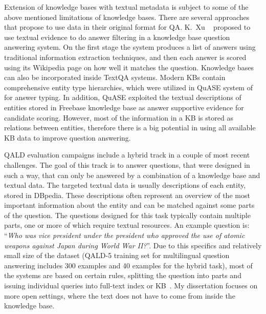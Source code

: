 Extension of knowledge bases with textual metadata is subject to some of the above mentioned limitations of knowledge bases.
There are several approaches that propose to use data in their original format for QA.
K.~Xu \etal~\cite{xu2016enhancing} proposed to use textual evidence to do answer filtering in a knowledge base question answering system.
On the first stage the system produces a list of answers using traditional information extraction techniques, and then each answer is scored using its Wikipedia page on how well it matches the question. 
Knowledge bases can also be incorporated inside TextQA systems.
Modern KBs contain comprehensive entity type hierarchies, which were utilized in QuASE system of~\cite{Sun:2015:ODQ:2736277.2741651} for answer typing.
In addition, QuASE exploited the textual descriptions of entities stored in Freebase knowledge base as answer supportive evidence for candidate scoring.
However, most of the information in a KB is stored as relations between entities, therefore there is a big potential in using all available KB data to improve question answering.

QALD evaluation campaigns include a hybrid track in a couple of most recent challenges.
The goal of this track is to answer questions, that were designed in such a way, that can only be answered by a combination of a knowledge base and textual data.
The targeted textual data is usually descriptions of each entity, stored in DBpedia.
These descriptions often represent an overview of the most important information about the entity and can be matched against some parts of the question.
The questions designed for this task typically contain multiple parts, one or more of which require textual resources.
An example question is: ``\textit{Who was vice president under the president who approved the use of atomic weapons against Japan during World War II?}''.
Due to this specifics and relatively small size of the dataset (QALD-5 training set for multilingual question answering includes 300 examples and 40 examples for the hybrid task), most of the systems are based on certain rules, \eg splitting the question into parts and issuing individual queries into full-text index or KB~\cite{park2015isoft,usbeck2015hawk}.
My dissertation focuses on more open settings, where the text does not have to come from inside the knowledge base.

